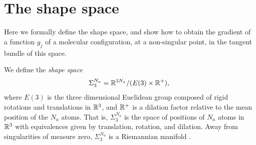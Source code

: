 \section{The shape space}
\label{app:shape-space}
Here we formally define the shape space, and show how to obtain the gradient of a function $g_j$ of a molecular configuration, at a non-singular point, in the tangent bundle of this space.

We define the \textit{shape space}
\begin{align*}
 \Sigma_3^{N_a} = {\mathbb R}^{3N_a} \slash (E(3) \times {\mathbb R}^+ ),
\end{align*}
where $E(3)$ is the three dimensional Euclidean group composed of rigid rotations and translations in ${\mathbb R}^3$, and ${\mathbb R}^+$ is a dilation factor relative to the mean position of the $N_a$ atoms. That is, $\Sigma_3^{N_a}$ is the space of positions of $N_a$ atoms in ${\mathbb R}^3$ with equivalences given by translation, rotation, and dilation. Away from singularities of measure zero, $\Sigma_3^{N_a}$ is a Riemannian manifold \citep{Le1993-mg, addicoatcollins:2010}.

